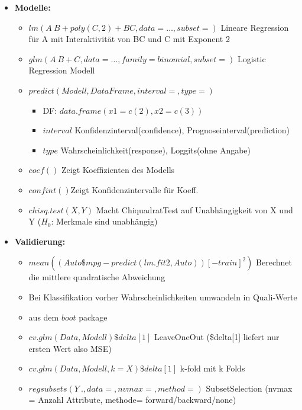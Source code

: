 \documentclass[a4paper]{article}
\begin{document}
\begin{landscape}
\begin{multicols}{3}
\begin{itemize} [noitemsep,nolistsep,leftmargin=*]
            \item \textbf{Modelle:}
            \begin{itemize}[noitemsep,nolistsep,leftmargin=*]
            \item $lm(A ~ B + poly(C,2) + BC, data = \dots, subset=)$ Lineare Regression für A mit Interaktivität von BC und C mit Exponent 2
            \item $glm(A ~ B + C, data=\dots, family = binomial, subset=)$ Logistic Regression Modell
            \item $predict(Modell, DataFrame, interval= , type= )$
                \begin{itemize}[noitemsep,nolistsep,leftmargin=*]
                    \item DF: $data.frame(x1 = c(2), x2 = c(3))$ 
                    \item $interval$ Konfidenzinterval(confidence), Prognoseinterval(prediction)
                    \item $type$ Wahrscheinlichkeit(response), Loggits(ohne Angabe)
                \end{itemize}
            \item $coef()$ Zeigt Koeffizienten des Modells
            \item $confint()$Zeigt  Konfidenzintervalle für Koeff.
            \item $chisq.test(X,Y)$ Macht ChiquadratTest auf Unabhängigkeit von X und Y ($H_0$: Merkmale sind unabhängig)
            \end{itemize}

            \item \textbf{Validierung:}
            \begin{itemize}[noitemsep,nolistsep,leftmargin=*]
                \item $mean((Auto\$mpg - predict(lm.fit2, Auto))[-train]^2)$ Berechnet die mittlere quadratische Abweichung
                \item Bei Klassifikation vorher Wahrscheinlichkeiten umwandeln in Quali-Werte
                \item aus dem $boot$ package
                \item $cv.glm(Data,Modell)\$delta[1]$ LeaveOneOut (\$delta[1] liefert nur ersten Wert also MSE)
                \item $cv.glm(Data,Modell, k=X)\$delta[1]$ k-fold mit k Folds
                \item $regsubsets(Y ~ ., data = , nvmax =, method = )$ SubsetSelection (nvmax = Anzahl Attribute, methode= forward/backward/none)
            \end{itemize}


\end{itemize}
\end{multicols}
\end{landscape}
\end{document}
